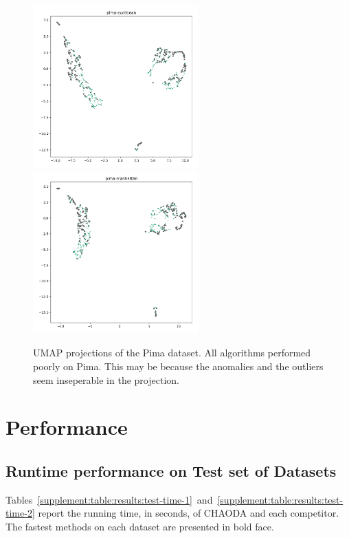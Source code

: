 \documentclass{article}
\begin{document}
\begin{figure}
   \centering
   \includegraphics[width=2.5in]{images/umaps/pima-euclidean-umap2d.png}
   \includegraphics[width=2.5in]{images/umaps/pima-manhattan-umap2d.png}
   \caption{UMAP projections of the Pima dataset.
   All algorithms performed poorly on Pima.
   This may be because the anomalies and the outliers seem inseperable in the projection.}
   \label{supplement:fig:conclusions:umap-embeddings-2}
\end{figure}


\section{Performance}
\label{supplement:sec:performance}

\subsection{Runtime performance on Test set of Datasets}

Tables~\ref{supplement:table:results:test-time-1}~and~\ref{supplement:table:results:test-time-2} report the running time, in seconds, of CHAODA and each competitor.
The fastest methods on each dataset are presented in bold face.
\end{document}
